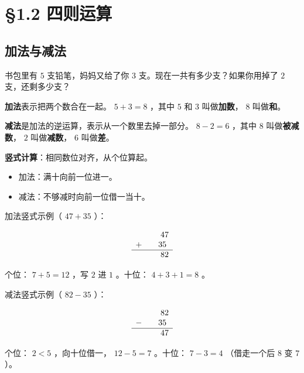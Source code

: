 \chapter{§1.2 四则运算}
\label{sec:1.2}





\section*{加法与减法}


\begin{explore}


书包里有 $5$ 支铅笔，妈妈又给了你 $3$ 支。现在一共有多少支？如果你用掉了 $2$ 支，还剩多少支？

\end{explore}

\begin{understand}


\textbf{加法}表示把两个数合在一起。 $5 + 3 = 8$ ，其中 $5$ 和 $3$ 叫做\textbf{加数}， $8$ 叫做\textbf{和}。

\textbf{减法}是加法的逆运算，表示从一个数里去掉一部分。 $8 - 2 = 6$ ，其中 $8$ 叫做\textbf{被减数}， $2$ 叫做\textbf{减数}， $6$ 叫做\textbf{差}。

\textbf{竖式计算}：相同数位对齐，从个位算起。
\begin{itemize}
  \item 加法：满十向前一位进一。
  \item 减法：不够减时向前一位借一当十。
\end{itemize}


加法竖式示例（ $47 + 35$ ）：

\[
\begin{array}{rl}
&\phantom{+}47 \\
+\enspace&\phantom{0}35 \\
\hline
&\phantom{+}82
\end{array}
\]


个位： $7 + 5 = 12$ ，写 $2$ 进 $1$ 。十位： $4 + 3 + 1 = 8$ 。

减法竖式示例（ $82 - 35$ ）：

\[
\begin{array}{rl}
&\phantom{-}82 \\
-\enspace&\phantom{0}35 \\
\hline
&\phantom{-}47
\end{array}
\]


个位： $2 < 5$ ，向十位借一， $12 - 5 = 7$ 。十位： $7 - 3 = 4$ （借走一个后 $8$ 变 $7$ ）。

\end{understand}

